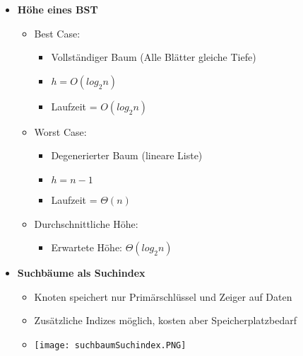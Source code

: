 \begin{itemize}
        \item \textbf{Höhe eines BST}
            \begin{itemize}
                \item Best Case:
                    \begin{itemize}
                        \item Vollständiger Baum (Alle Blätter gleiche Tiefe)
                        \item $h = O(log_2 n)$
                        \item Laufzeit = $O(log_2 n)$
                    \end{itemize}
                \item Worst Case:
                    \begin{itemize}
                        \item Degenerierter Baum (lineare Liste)
                        \item $h = n - 1$
                        \item Laufzeit = $\Theta(n)$
                    \end{itemize}
                \item Durchschnittliche Höhe:
                    \begin{itemize}
                        \item Erwartete Höhe: $\Theta(log_2 n)$
                    \end{itemize}
            \end{itemize}

        \item \textbf{Suchbäume als Suchindex}
            \begin{itemize}
                \item Knoten speichert nur Primärschlüssel und Zeiger auf Daten
                \item Zusätzliche Indizes möglich, kosten aber Speicherplatzbedarf
                \item[] \texttt{[image: suchbaumSuchindex.PNG]}
            \end{itemize}
    \end{itemize}


